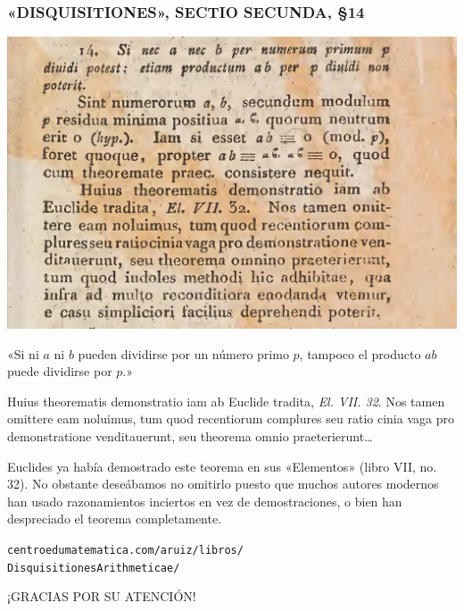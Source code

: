 \begin{frame}
  \frametitle{«DISQUISITIONES», SECTIO SECUNDA, \S 14}

  \begin{center}
    \includegraphics[width=.9\textwidth]{disquisitiones-14.jpg}

    «Si ni $a$ ni $b$ pueden dividirse por un número primo $p$, tampoco el
    producto $ab$ puede dividirse por $p$.»
  \end{center}
\end{frame}

\begin{frame}

  \begin{multicols}{2}\small
    Huius theorematis demonstratio iam ab Euclide tradita,
    \emph{El. VII. 32}. Nos tamen omittere eam noluimus, tum quod recentiorum
    complures seu ratio cinia vaga pro demonstratione venditauerunt,
    seu theorema omnio praeterierunt\dots

    \vfill\null
    \columnbreak

    Euclides ya había demostrado este teorema en sus «Elementos» (libro VII,
    no. 32). No obstante deseábamos no omitirlo puesto que muchos autores
    modernos han usado razonamientos inciertos en vez de demostraciones, o bien
    han despreciado el teorema completamente.
  \end{multicols}

  \texttt{centroedumatematica.com/aruiz/libros/\\
    DisquisitionesArithmeticae/}
\end{frame}

\begin{frame}

  \vfill

  \begin{center}\huge\headingfont
    ¡GRACIAS POR SU ATENCIÓN!
  \end{center}

  \vfill
\end{frame}

